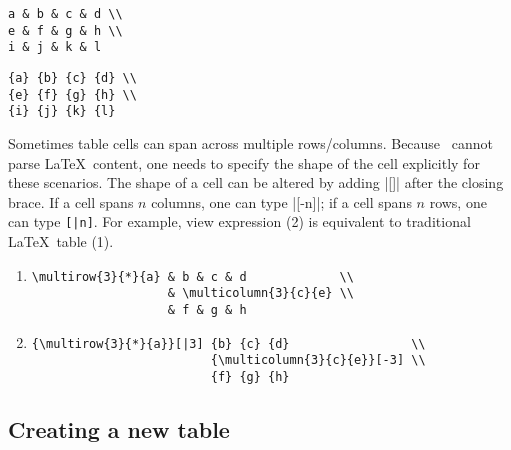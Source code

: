 \documentclass{l3doc}
\newcommand{\thispkg}{\pkg{luaprogtable}}
\begin{document}
\begin{documentation}
\begin{itemize}
\begin{center}
\begin{BVerbatim}[gobble=0]
a & b & c & d \\
e & f & g & h \\
i & j & k & l
\end{BVerbatim}
\hspace{1cm}
\begin{BVerbatim}[gobble=0]
{a} {b} {c} {d} \\
{e} {f} {g} {h} \\
{i} {j} {k} {l}
\end{BVerbatim}
\end{center}

Sometimes table cells can span across multiple rows/columns. Because \thispkg\ cannot parse \LaTeX\ content, one needs to specify the shape of the cell explicitly for these scenarios. The shape of a cell can be altered by adding |[]| after the closing brace. If a cell spans $n$ columns, one can type |[-n]|; if a cell spans $n$ rows, one can type \verb`[|n]`. For example, view expression (2) is equivalent to traditional \LaTeX\ table (1).

\begin{enumerate}[label=(\arabic*)]
\item 
\begin{BVerbatim}[baseline=t, gobble=0]
\multirow{3}{*}{a} & b & c & d             \\
                   & \multicolumn{3}{c}{e} \\
                   & f & g & h
\end{BVerbatim}


\item 
\begin{BVerbatim}[baseline=t, gobble=0]
{\multirow{3}{*}{a}}[|3] {b} {c} {d}                 \\
                         {\multicolumn{3}{c}{e}}[-3] \\
                         {f} {g} {h}
\end{BVerbatim}

\end{enumerate}


\end{itemize}

\subsection{Creating a new table}

\begin{function}{\LPTNewTable}
    \begin{syntax}
        
    \end{syntax}
    

\end{function}
\end{documentation}
\end{document}
